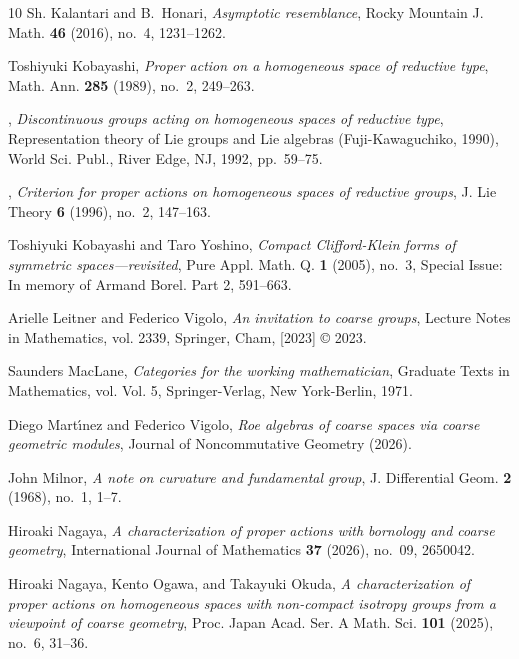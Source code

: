 \documentclass[12pt, a4paper]{amsart}
\theoremstyle{definition}
\begin{document}
\begin{thebibliography}{10}
Sh. Kalantari and B.~Honari, \emph{Asymptotic resemblance}, Rocky Mountain J.
  Math. \textbf{46} (2016), no.~4, 1231--1262. 

Toshiyuki Kobayashi, \emph{Proper action on a homogeneous space of reductive
  type}, Math. Ann. \textbf{285} (1989), no.~2, 249--263. 

\bysame, \emph{Discontinuous groups acting on homogeneous spaces of reductive
  type}, Representation theory of {L}ie groups and {L}ie algebras
  ({F}uji-{K}awaguchiko, 1990), World Sci. Publ., River Edge, NJ, 1992,
  pp.~59--75. 

\bysame, \emph{Criterion for proper actions on homogeneous spaces of reductive
  groups}, J. Lie Theory \textbf{6} (1996), no.~2, 147--163. 

Toshiyuki Kobayashi and Taro Yoshino, \emph{Compact {C}lifford-{K}lein forms of
  symmetric spaces---revisited}, Pure Appl. Math. Q. \textbf{1} (2005), no.~3,
  Special Issue: In memory of Armand Borel. Part 2, 591--663. 

Arielle Leitner and Federico Vigolo, \emph{An invitation to coarse groups},
  Lecture Notes in Mathematics, vol. 2339, Springer, Cham, [2023] \copyright
  2023. 

Saunders MacLane, \emph{Categories for the working mathematician}, Graduate
  Texts in Mathematics, vol. Vol. 5, Springer-Verlag, New York-Berlin, 1971.

Diego Mart{\'\i}nez and Federico Vigolo, \emph{Roe algebras of coarse spaces
  via coarse geometric modules}, Journal of Noncommutative Geometry (2026).

John Milnor, \emph{A note on curvature and fundamental group}, J. Differential
  Geom. \textbf{2} (1968), no.~1, 1--7.

Hiroaki Nagaya, \emph{A characterization of proper actions with bornology and
  coarse geometry}, International Journal of Mathematics \textbf{37} (2026),
  no.~09, 2650042.

Hiroaki Nagaya, Kento Ogawa, and Takayuki Okuda, \emph{A characterization of
  proper actions on homogeneous spaces with non-compact isotropy groups from a
  viewpoint of coarse geometry}, Proc. Japan Acad. Ser. A Math. Sci.
  \textbf{101} (2025), no.~6, 31--36. 


\end{thebibliography}
\end{document}
